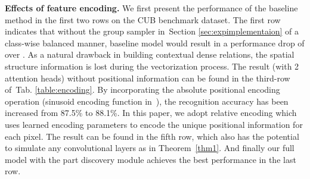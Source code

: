 \documentclass[journal]{IEEEtran}
\newcommand{\tabref}[1]{Tab. \ref{#1}}
\newcommand{\secref}[1]{Section \ref{#1}}
\begin{document}
\textbf{Effects of feature encoding.} We first present the performance of the baseline method in the first two rows on the CUB benchmark dataset. The first row indicates that without the group sampler in~\secref{sec:expimplementaion} of a class-wise balanced manner, baseline model would result in a performance drop of over .
As a natural drawback in building contextual dense relations, the spatial structure information is lost during the vectorization process. The result (with 2 attention heads) without positional information can be found in the third-row of~\tabref{table:encoding}. By incorporating the absolute positional encoding operation (sinusoid encoding function in~\cite{vaswani2017attention}), the recognition accuracy has been increased from 87.5\% to 88.1\%. In this paper, we adopt relative encoding which uses learned encoding parameters to encode the unique positional information for each pixel. The result can be found in the fifth row, which also has the potential to simulate any convolutional layers as in Theorem~\ref{thm1}. And finally our full model with the part discovery module achieves the best performance in the last row.


\begin{table}[t]
\end{table}
\end{document}
